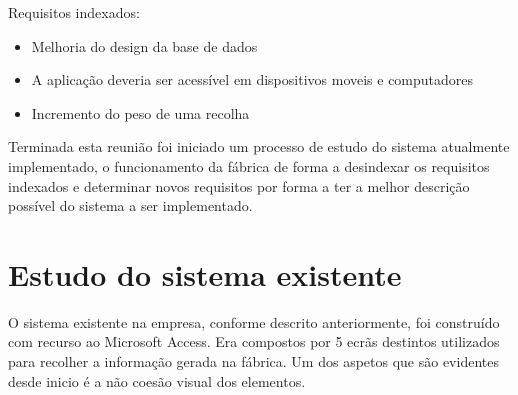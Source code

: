 Requisitos indexados:
\begin{itemize}
	\item Melhoria do design da base de dados
	\item A aplicação deveria ser acessível em dispositivos moveis e computadores
	\item Incremento do peso de uma recolha
\end{itemize}
Terminada esta reunião foi iniciado um processo de estudo do sistema atualmente implementado, o funcionamento da fábrica de forma a desindexar os requisitos indexados e determinar novos requisitos por forma a ter a melhor descrição possível do sistema a ser implementado.

\section{Estudo do sistema existente}
O sistema existente na empresa, conforme descrito anteriormente, foi construído com recurso ao Microsoft Access. Era compostos por 5 ecrãs destintos utilizados para recolher a informação gerada na fábrica. Um dos aspetos que são evidentes desde inicio é a não coesão visual dos elementos.

